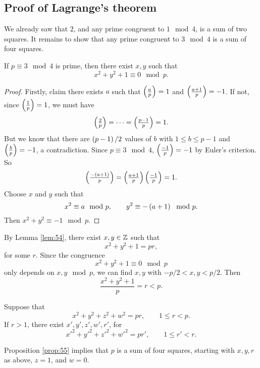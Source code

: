 \pagebreak

\subsection{Proof of Lagrange's theorem}

We already saw that $ 2 $, and any prime congruent to $ 1 \mod 4 $, is a sum of two squares. It remains to show that any prime congruent to $ 3 \mod 4 $ is a sum of four squares.


\begin{lemma}
\label{lem:54}
If $ p \equiv 3 \mod 4 $ is prime, then there exist $ x, y $ such that
$$ x^2 + y^2 + 1 \equiv 0 \mod p. $$
\end{lemma}

\begin{proof}
Firstly, claim there exists $ a $ such that $ \jacobi{a}{p} = 1 $ and $ \jacobi{a + 1}{p} = -1 $. If not, since $ \jacobi{1}{p} = 1 $, we must have
$$ \jacobi{2}{p} = \dots = \jacobi{p - 1}{p} = 1. $$
But we know that there are $ \br{p - 1} / 2 $ values of $ b $ with $ 1 \le b \le p - 1 $ and $ \jacobi{b}{p} = -1 $, a contradiction. Since $ p \equiv 3 \mod 4 $, $ \jacobi{-1}{p} = -1 $ by Euler's criterion. So
$$ \jacobi{-\br{a + 1}}{p} = \jacobi{a + 1}{p}\jacobi{-1}{p} = 1. $$
Choose $ x $ and $ y $ such that
$$ x^2 \equiv a \mod p, \qquad y^2 \equiv -\br{a + 1} \mod p. $$
Then $ x^2 + y^2 \equiv -1 \mod p $.
\end{proof}

By Lemma \ref{lem:54}, there exist $ x, y \in \mathbb{Z} $ such that
$$ x^2 + y^2 + 1 = pr, $$
for some $ r $. Since the congruence
$$ x^2 + y^2 + 1 \equiv 0 \mod p $$
only depends on $ x, y \mod p $, we can find $ x, y $ with $ -p / 2 < x, y < p / 2 $. Then
$$ \dfrac{x^2 + y^2 + 1}{p} = r < p. $$

\begin{proposition}
\label{prop:55}
Suppose that
$$ x^2 + y^2 + z^2 + w^2 = pr, \qquad 1 \le r < p. $$
If $ r > 1 $, there exist $ x', y', z', w', r' $, for
$$ x'^2 + y'^2 + z'^2 + w'^2 = pr', \qquad 1 \le r' < r. $$
\end{proposition}

Proposition \ref{prop:55} implies that $ p $ is a sum of four squares, starting with $ x, y, r $ as above, $ z = 1 $, and $ w = 0 $.

